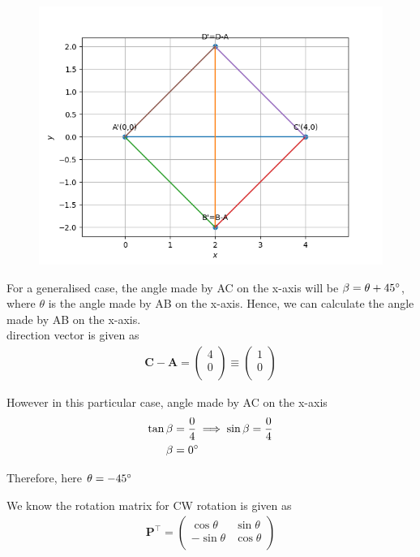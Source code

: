 \documentclass[12pt]{article}
\newcommand{\myvec}[1]{\ensuremath{\begin{pmatrix}#1\end{pmatrix}}}
\let\vec\mathbf
\begin{document}
\begin{figure}[!h]
	\begin{center} 
	    \includegraphics[width=\columnwidth]{figs/square1}
	\end{center}
\caption{}
\label{fig:Fig2}
\end{figure}

\newpage

For a generalised case, the angle made by AC on the x-axis will be $\beta = \theta + 45\degree$, where $\theta$ is the angle made by AB on the x-axis.
Hence, we can calculate the angle made by AB on the x-axis.\\

direction vector is given as
\begin{align}
\vec{C} - \vec{A} = \myvec{
4\\
0\\
} \equiv 
\myvec{
1\\
0\\
}
\end{align}

However in this particular case, angle made by AC on the x-axis
\begin{align}
\tan\beta &= \frac{0}{4} \implies \sin\beta = \frac{0}{4}\\
\beta &= 0\degree
\end{align}

Therefore, here $\theta = -45\degree$

We know the rotation matrix for CW rotation is given as
\begin{align}
\vec{P}^\top =
\myvec{
\cos\theta & \sin\theta \\
-\sin\theta & \cos\theta \\
}
\end{align}
\end{document}

